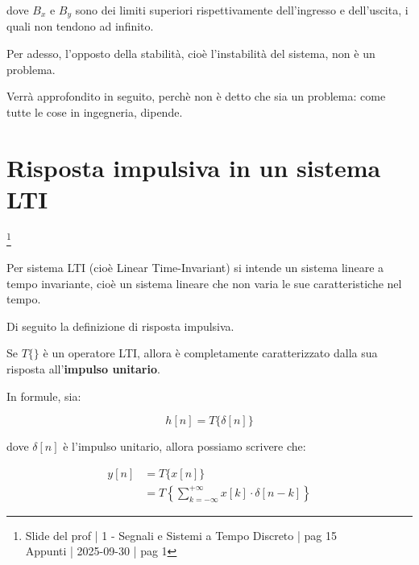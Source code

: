 dove $B_x$ e $B_y$ sono dei limiti superiori rispettivamente dell'ingresso e dell'uscita, 
i quali non tendono ad infinito. \newline 

\begin{tcolorbox}

Per adesso, l'opposto della stabilità, cioè l'instabilità del sistema, non è un problema. \newline 

Verrà approfondito in seguito, perchè non è detto che sia un problema: 
come tutte le cose in ingegneria, dipende.
\end{tcolorbox}

\newpage 

\section{Risposta impulsiva in un sistema LTI}

\footnote{ 
    Slide del prof | 1 - Segnali e Sistemi a Tempo Discreto | pag 15\\
    Appunti | 2025-09-30 | pag 1
}

Per sistema LTI (cioè Linear Time-Invariant) si intende 
un sistema lineare a tempo invariante, cioè un sistema lineare che non varia le sue caratteristiche nel tempo. \newline 


Di seguito la definizione di risposta impulsiva. \newline 

Se $T \{ \}$ è un operatore LTI, 
allora è completamente caratterizzato dalla sua risposta all'\textbf{impulso unitario}. \newline 

In formule, sia: 

{
    \Large 
    \begin{equation}
        h \left[ n \right] 
        = 
        T \{ \delta \left[ n \right] \}
    \end{equation}
}

dove $\delta \left[ n \right]$ è l'impulso unitario, 
allora possiamo scrivere che: 

{
    \Large 
    \begin{equation}
        \begin{split}
            y \left[ n\right]
            &= 
            T \{ x \left[ n\right]\}
            \\
            &= 
            T 
            \left\{ 
                \sum_{k = - \infty}^{+ \infty}
                x \left[ k\right]
                \cdot 
                \delta \left[ n - k\right]
            \right\}
        \end{split}
    \end{equation}
}

